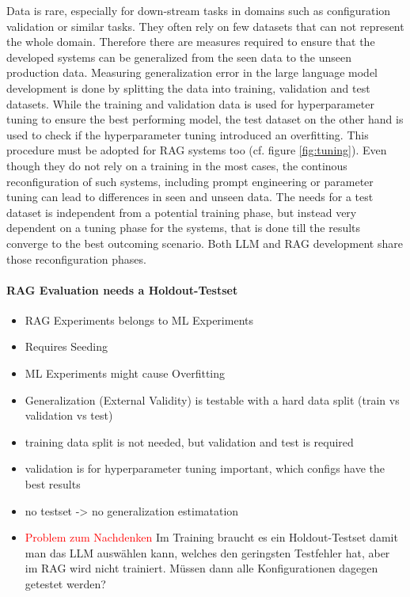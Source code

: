 Data is rare, especially for down-stream tasks in domains such as configuration validation or similar tasks. They often rely on few datasets that can not represent the whole domain. Therefore there are measures required to ensure that the developed systems can be generalized from the seen data to the unseen production data. Measuring generalization error in the large language model development is done by splitting the data into training, validation and test datasets. While the training and validation data is used for hyperparameter tuning to ensure the best performing model, the test dataset on the other hand is used to check if the hyperparameter tuning introduced an overfitting. This procedure must be adopted for RAG systems too (cf. figure \ref{fig:tuning}). Even though they do not rely on a training in the most cases, the continous reconfiguration of such systems, including prompt engineering or parameter tuning can lead to differences in seen and unseen data. The needs for a test dataset is independent from a potential training phase, but instead very dependent on a tuning phase for the systems, that is done till the results converge to the best outcoming scenario. Both LLM and RAG development share those reconfiguration phases. 


\paragraph{RAG Evaluation needs a Holdout-Testset}
\begin{itemize}
    \item RAG Experiments belongs to ML Experiments 
    \item Requires Seeding
    \item ML Experiments might cause Overfitting
    \item Generalization (External Validity) is testable with a hard data split (train vs validation vs test)
    \item training data split is not needed, but validation and test is required
    \item validation is for hyperparameter tuning important, which configs have the best results
    \item no testset -> no generalization estimatation
    \item \textcolor{red}{Problem zum Nachdenken} Im Training braucht es ein Holdout-Testset damit man das LLM auswählen kann, welches den geringsten Testfehler hat, aber im RAG wird nicht trainiert. Müssen dann alle Konfigurationen dagegen getestet werden?
\end{itemize}


